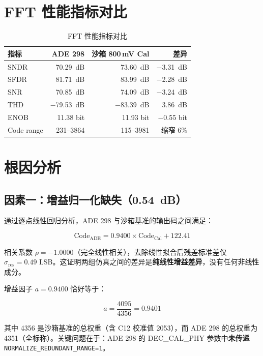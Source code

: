 \documentclass[12pt,a4paper]{article}
\begin{document}
\section{FFT 性能指标对比}

\begin{table}[H]
\centering
\caption{FFT 性能指标对比}
\label{tab:fft_metrics}
\begin{tabular}{lrrr}
\toprule
指标 & ADE 298 & 沙箱 800\,mV Cal & 差异 \\
\midrule
SNDR & \SI{70.29}{dB} & \SI{73.60}{dB} & \SI{-3.31}{dB} \\
SFDR & \SI{81.71}{dB} & \SI{83.99}{dB} & \SI{-2.28}{dB} \\
SNR & \SI{70.85}{dB} & \SI{74.09}{dB} & \SI{-3.24}{dB} \\
THD & \SI{-79.53}{dB} & \SI{-83.39}{dB} & \SI{+3.86}{dB} \\
ENOB & 11.38 bit & 11.93 bit & $-$0.55 bit \\
Code range & 231--3864 & 115--3981 & 缩窄 6\% \\
\bottomrule
\end{tabular}
\end{table}

\section{根因分析}

\subsection{因素一：增益归一化缺失（\SI{0.54}{dB}）}

通过逐点线性回归分析，ADE 298 与沙箱基准的输出码之间满足：

\begin{equation}
\text{Code}_{\text{ADE}} = 0.9400 \times \text{Code}_{\text{Cal}} + 122.41
\end{equation}

相关系数 $\rho = -1.0000$（完全线性相关），去除线性拟合后残差标准差仅 $\sigma_{\text{res}} = 0.49$ LSB。这证明两组仿真之间的差异是\textbf{纯线性增益差异}，没有任何非线性成分。

增益因子 $a = 0.9400$ 恰好等于：

\begin{equation}
a = \frac{4095}{4356} = 0.9401
\end{equation}

其中 4356 是沙箱基准的总权重（含 C12 校准值 2053），而 ADE 298 的总权重为 4351（全标称）。关键问题在于：ADE 298 的 DEC\_CAL\_PHY 参数中\textbf{未传递} \texttt{NORMALIZE\_REDUNDANT\_RANGE=1}。
\end{document}
